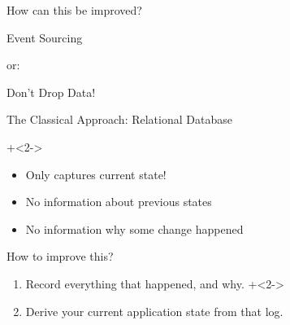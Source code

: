\begin{frame}[fragile]{}

\begin{center}
\LARGE
How can this be improved?
\end{center}             
                  
\end{frame}

\begin{frame}[fragile]{}

\begin{center}
{
\LARGE
Event Sourcing
}

\vspace{2em}

or:

\vspace{2em}

{
\Large
Don't Drop Data!
}
\end{center}
\end{frame}

\begin{frame}[fragile]{The Classical Approach: Relational Database}

\onslide+<2->  
\begin{itemize}                
\item Only captures current state!
\item No information about previous states
\item No information why some change happened
\end{itemize}
                   
\end{frame}

\begin{frame}[fragile]{How to improve this?}

\renewcommand{\SPACE}{1em}

\begin{enumerate}
\item Record everything that happened, and why.
\onslide+<2->  
\item Derive your current application state from that log.
\end{enumerate}         
                  
\end{frame}

